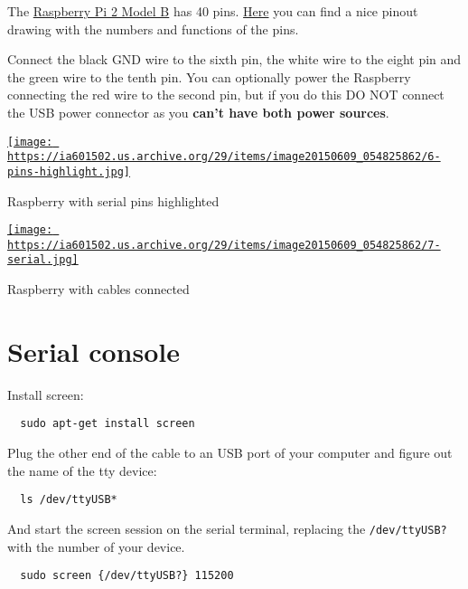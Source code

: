 \documentclass[12pt]{article}
\begin{document}
The \href{https://www.adafruit.com/products/2358}{Raspberry Pi 2 Model B} has
40 pins. \href{http://www.pighixxx.com/test/2015/06/raspberry-pi-v2-mod-b-pinout/#prettyPhoto[gallery1105]/0/}
{Here} you can find a nice pinout drawing with the numbers and functions of the
pins.

Connect the black GND wire to the sixth pin, the white wire to the eight pin
and the green wire to the tenth pin. You can optionally power the Raspberry
connecting the red wire to the second pin, but if you do this DO NOT connect
the USB power connector as you \textbf{can't have both power sources}.

\begin{center}
  \href{
    https://ia601502.us.archive.org/29/items/image20150609_054825862/6-pins-highlight.jpg}{
    \texttt{[image: 
      https://ia601502.us.archive.org/29/items/image20150609\_054825862/6-pins-highlight.jpg]}
  }
  \caption{Raspberry with serial pins highlighted}
\end{center}

\begin{center}
  \href{
    https://ia601502.us.archive.org/29/items/image20150609_054825862/7-serial.jpg}{
    \texttt{[image: 
      https://ia601502.us.archive.org/29/items/image20150609\_054825862/7-serial.jpg]}
  }
  \caption{Raspberry with cables connected}
\end{center}

\section{Serial console}

Install screen:

\begin{verbatim}
  sudo apt-get install screen
\end{verbatim}

Plug the other end of the cable to an USB port of your computer and figure out the name of the tty device:

\begin{verbatim}
  ls /dev/ttyUSB*
\end{verbatim}

And start the screen session on the serial terminal, replacing the
\verb$/dev/ttyUSB?$ with the number of your device.

\begin{verbatim}
  sudo screen {/dev/ttyUSB?} 115200
\end{verbatim}
\end{document}
